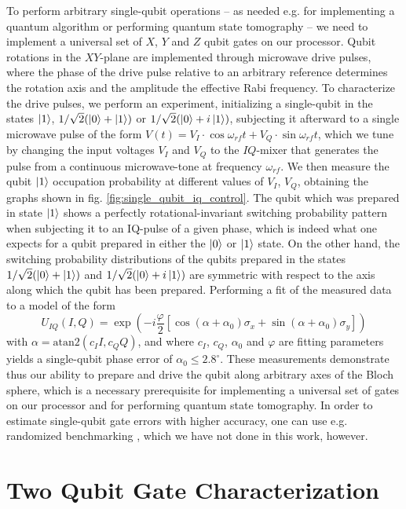 To perform arbitrary single-qubit operations -- as needed e.g. for implementing a quantum algorithm or performing quantum state tomography -- we need to implement a universal set of $X$, $Y$ and $Z$ qubit gates on our processor. Qubit rotations in the $XY$-plane are implemented through microwave drive pulses, where the phase of the drive pulse relative to an arbitrary reference determines the rotation axis and the amplitude the effective Rabi frequency. To characterize the drive pulses, we perform an experiment, initializing a single-qubit in the states $\left| 1 \right>$, $1/\sqrt{2}(\left| 0 \right>+\left| 1 \right>)$ or $1/\sqrt{2}(\left| 0 \right>+i\left| 1 \right>)$, subjecting it afterward to a single microwave pulse of the form $V(t) = V_I\cdot\cos{\omega_{rf}t}+V_Q\cdot\sin{\omega_{rf}t}$, which we tune by changing the input voltages $V_I$ and $V_Q$ to the $IQ$-mixer that generates the pulse from a continuous microwave-tone at frequency $\omega_{rf}$. We then measure the qubit $\left| 1 \right>$ occupation probability at different values of $V_I$, $V_Q$, obtaining the graphs shown in fig. \ref{fig:single_qubit_iq_control}. The qubit which was prepared in state $\left| 1 \right>$ shows a perfectly rotational-invariant switching probability pattern when subjecting it to an IQ-pulse of a given phase, which is indeed what one expects for a qubit prepared in either the $\left| 0 \right>$ or $\left| 1 \right>$ state. On the other hand, the switching probability distributions of the qubits prepared in the states $1/\sqrt{2}(\left| 0 \right>+\left| 1 \right>)$ and $1/\sqrt{2}(\left| 0 \right>+i\left| 1 \right>)$ are symmetric with respect to the axis along which the qubit has been prepared. Performing a fit of the measured data to a model of the form
%
\begin{equation}
U_{IQ}(I,Q) = \exp{\left(-i\frac{\varphi}{2}[\cos{(\alpha+\alpha_0)}\sigma_x+\sin{(\alpha+\alpha_0)}\sigma_y]\right)} \label{eq:iq_model}
\end{equation}
%
with $\alpha=\mathrm{atan2}{(c_I I,c_Q Q)}$, and where $c_I$, $c_Q$, $\alpha_0$ and $\varphi$ are fitting parameters yields a single-qubit phase error of $\alpha_0 \le 2.8^\circ$. These measurements demonstrate thus our ability to prepare and drive the qubit along arbitrary axes of the Bloch sphere, which is a necessary prerequisite for implementing a universal set of gates on our processor and for performing quantum state tomography. In order to estimate single-qubit gate errors with higher accuracy, one can use e.g. randomized benchmarking \citep{knill_randomized_2008}, which we have not done in this work, however.

\section{Two Qubit Gate Characterization}

